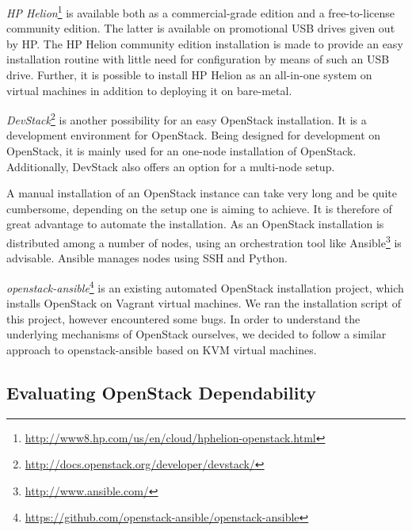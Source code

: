\emph{HP Helion}\footnote{\url{http://www8.hp.com/us/en/cloud/hphelion-openstack.html}} is available both as a commercial-grade edition and a free-to-license community edition. The latter is available on promotional USB drives given out by HP. The HP Helion community edition installation is made to provide an easy installation routine with little need for configuration by means of such an USB drive. Further, it is possible to install HP Helion as an all-in-one system on virtual machines in addition to deploying it on bare-metal. 

\emph{DevStack}\footnote{\url{http://docs.openstack.org/developer/devstack/}} is another possibility for an easy OpenStack installation. It is a development environment for OpenStack. Being designed for development on OpenStack, it is mainly used for an one-node installation of OpenStack. Additionally, DevStack also offers an option for a multi-node setup.

A manual installation of an OpenStack instance can take very long and be quite cumbersome, depending on the setup one is aiming to achieve. It is therefore of great advantage to automate the installation. As an OpenStack installation is distributed among a number of nodes, using an orchestration tool like Ansible\footnote{\url{http://www.ansible.com/}} is advisable. Ansible manages nodes using SSH and Python. 

\emph{openstack-ansible}\footnote{\url{https://github.com/openstack-ansible/openstack-ansible}} is an existing automated OpenStack installation project, which installs OpenStack on Vagrant virtual machines. We ran the installation script of this project, however encountered some bugs. In order to understand the underlying mechanisms of OpenStack ourselves, we decided to follow a similar approach to openstack-ansible based on KVM virtual machines.


\subsection{Evaluating OpenStack Dependability}

